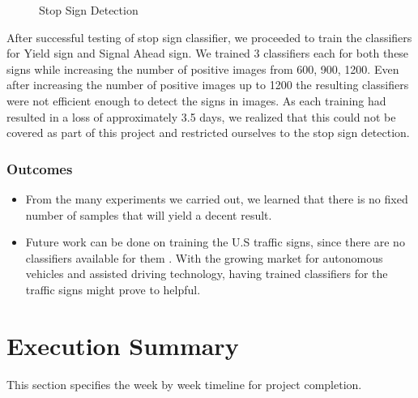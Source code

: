 \documentclass[9pt,twocolumn,twoside]{../../styles/osajnl}
\begin{document}
\begin{figure}[htbp]
\centering
{}
\caption{Stop Sign Detection}
\label{fig:detect}
\end{figure}

After successful testing of stop sign classifier, we proceeded to
train the classifiers for Yield sign and Signal Ahead sign. We trained
3 classifiers each for both these signs while increasing the number of
positive images from 600, 900, 1200. Even after increasing the number
of positive images up to 1200 the resulting classifiers were not
efficient enough to detect the signs in images.  As each training had
resulted in a loss of approximately 3.5 days, we realized that this
could not be covered as part of this project and restricted ourselves
to the stop sign detection.
\subsubsection{Outcomes}
\begin{itemize}
\item From the many experiments we carried out, we learned that there
  is no fixed number of samples that will yield a decent result.
\item Future work can be done on training the U.S traffic signs, since
  there are no classifiers available for them . With the growing
  market for autonomous vehicles and assisted driving technology,
  having trained classifiers for the traffic signs might prove to
  helpful.
\end{itemize}

\section{Execution Summary}
This section specifies the week by week timeline for project
completion.
\end{document}
